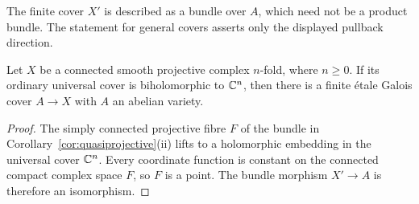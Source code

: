 The finite cover \(X'\) is described as a bundle over \(A\), which need
not be a product bundle. The statement for general covers asserts only
the displayed pullback direction.

\begin{corollary}
\label{cor:affine-uniformization}
Let \(X\) be a connected smooth projective complex \(n\)-fold, where
\(n\geq0\). If its ordinary universal cover is biholomorphic to \(\mathbb C^n\),
then there is a finite \'etale Galois cover \(A\to X\) with \(A\) an
abelian variety.
\end{corollary}

\begin{proof}
The simply connected projective fibre \(F\) of the bundle in
Corollary~\ref{cor:quasiprojective}\textup{(ii)} lifts to a holomorphic embedding
in the universal cover \(\mathbb C^n\). Every coordinate function is constant
on the connected compact complex space \(F\), so \(F\) is a point. The
bundle morphism \(X'\to A\) is therefore an isomorphism.
\end{proof}
